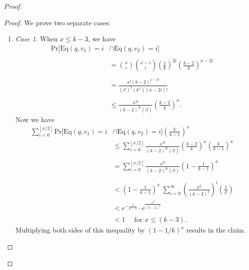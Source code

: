 \documentclass[12pt, a4paper]{article}
\begin{document}
\begin{proof}
		\begin{proof}
		We prove two separate cases:
			\begin{enumerate}[label=]
			\item\textit{Case 1.} When $x \leq k-3$, we have
            	\begin{align*}
            	\text{Pr}[\text{Eq}(q,v_1) = i & \cap \text{Eq}(q,v_2) = i]\\\\
            	&= \binom{x}{i}\binom{x-i}{i}\left(\frac{1}{k}\right)^{2i}
				\left(\frac{k-2}{k}\right)^{x-2i}\\\\
            	&=\frac{x!(k-2)^{x-2i}}{(i!)^2(k^x)(x-2i)!} \\\\
            	&\leq \frac{x^{2i}}{(k-2)^{2i}(i!)}\left(\frac{k-2}{k}\right)^x.
            	\end{align*}
            Now we have
                \begin{align*}
                \sum_{i=0}^{\left\lfloor x/2 \right\rfloor}
                \text{Pr}[\text{Eq}(q,v_1) = i
                & \cap \text{Eq}(q,v_2) = i] \left(\frac{k}{k-1}\right)^x\\
                &\leq \sum_{i=0}^{\left\lfloor x/2 \right\rfloor}
                \frac{x^{2i}}{(k-2)^{2i}(i!)}\left(\frac{k-2}{k}\right)^x
                \left(\frac{k}{k-1}\right)^x \\\\
                &=\sum_{i=0}^{\left\lfloor x/2 \right\rfloor}
                \frac{x^{2i}}{(k-2)^{2i}(i!)}
                \left(1-\frac{1}{k-1}\right)^x \\\\
                &<\left(1-\frac{1}{k-1}\right)^x ~ \sum_{i=0}^{\infty}
                \left(\frac{x^2}{(k-2)^2}\right)^i\left(\frac{1}{i!}\right) \\
                &<e^{-\frac{x}{k-1}}\cdot e^\frac{x^2}{(k-2)^2} \\\\
                &<1\quad \text{ for } x \leq (k-3).
                \end{align*}
            Multiplying both sides of this inequality by $(1-1/k)^x$ results in
            the claim.\\
            

\end{enumerate}
\end{proof}
\end{proof}
\end{document}
